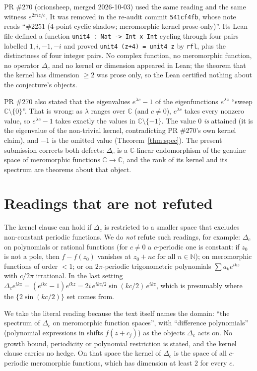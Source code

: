 \documentclass[11pt]{article}
\theoremstyle{definition}
\theoremstyle{remark}
\renewcommand{\_}{\oldus\allowbreak}
\begin{document}
PR \#270 (orionsheep, merged 2026-10-03) used the same reading and the same witness
$e^{2\pi iz/c}$. It was removed in the re-audit commit \texttt{541cf4fb}, whose note reads
``\#2251 (4-point cyclic shadow; meromorphic kernel prose-only)''. Its Lean file defined a function
\texttt{unit4 : Nat -> Int x Int} cycling through four pairs labelled $1,i,-1,-i$ and proved
\texttt{unit4 (z+4) = unit4 z} by \texttt{rfl}, plus the distinctness of four integer pairs. No complex
function, no meromorphic function, no operator $\Delta_c$ and no kernel or dimension appeared in Lean; the
theorem that the kernel has dimension $\ge2$ was prose only, so the Lean certified nothing about the
conjecture's objects.

PR \#270 also stated that the eigenvalues $e^{\lambda c}-1$ of the eigenfunctions $e^{\lambda z}$ ``sweep
$\mathbb{C}\setminus\{0\}$''. That is wrong: as $\lambda$ ranges over $\mathbb{C}$ (and $c\ne0$),
$e^{\lambda c}$ takes every nonzero value, so $e^{\lambda c}-1$ takes exactly the values in
$\mathbb{C}\setminus\{-1\}$. The value $0$ \emph{is} attained (it is the eigenvalue of the non-trivial
kernel, contradicting PR \#270's own kernel claim), and $-1$ is the omitted value
(Theorem~\ref{thm:spec}). The present submission corrects both defects: $\Delta_c$ is a
$\mathbb{C}$-linear endomorphism of the genuine space of meromorphic functions $\mathbb{C}\to\mathbb{C}$,
and the rank of its kernel and its spectrum are theorems about that object.

\section{Readings that are not refuted}\label{sec:readings}

The kernel clause can hold if $\Delta_c$ is restricted to a smaller space that excludes non-constant
periodic functions. We do \emph{not} refute such readings, for example: $\Delta_c$ on polynomials or
rational functions (for $c\neq 0$ a $c$-periodic one is constant: if $z_0$ is not a pole, then
$f-f(z_0)$ vanishes at $z_0+nc$ for all $n\in\mathbb{N}$); on meromorphic functions of order $<1$; or on $2\pi$-periodic trigonometric polynomials
$\sum a_k e^{ikz}$ with $c/2\pi$ irrational. In the last setting
$\Delta_c e^{ikz}=(e^{ikc}-1)e^{ikz}=2i\,e^{ikc/2}\sin(kc/2)\,e^{ikz}$, which is presumably where the
$\{2\sin(kc/2)\}$ set comes from.

We take the literal reading because the text itself names the domain: ``the spectrum of $\Delta_c$ on
meromorphic function spaces'', with ``difference polynomials'' (polynomial expressions in shifts
$f(z+c_j)$) as the objects $\Delta_c$ acts on. No growth bound, periodicity or polynomial restriction is
stated, and the kernel clause carries no hedge. On that space the kernel of $\Delta_c$ is the space of all
$c$-periodic meromorphic functions, which has dimension at least $2$ for every $c$.
\end{document}
